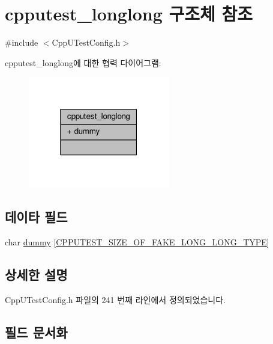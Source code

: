 \hypertarget{structcpputest__longlong}{}\section{cpputest\+\_\+longlong 구조체 참조}
\label{structcpputest__longlong}


{\ttfamily \#include $<$Cpp\+U\+Test\+Config.\+h$>$}



cpputest\+\_\+longlong에 대한 협력 다이어그램\+:
\nopagebreak
\begin{figure}[H]
\begin{center}
\leavevmode
\includegraphics[width=175pt]{structcpputest__longlong__coll__graph}
\end{center}
\end{figure}
\subsection*{데이타 필드}
\begin{DoxyCompactItemize}
\item 
char \hyperlink{structcpputest__longlong_a3aa94a3fffaef9e393bfe23c93aa6688}{dummy} \mbox{[}\hyperlink{_cpp_u_test_config_8h_a084cf63afb45ec9a8966002efa2d1f9a}{C\+P\+P\+U\+T\+E\+S\+T\+\_\+\+S\+I\+Z\+E\+\_\+\+O\+F\+\_\+\+F\+A\+K\+E\+\_\+\+L\+O\+N\+G\+\_\+\+L\+O\+N\+G\+\_\+\+T\+Y\+PE}\mbox{]}
\end{DoxyCompactItemize}


\subsection{상세한 설명}


Cpp\+U\+Test\+Config.\+h 파일의 241 번째 라인에서 정의되었습니다.



\subsection{필드 문서화}
